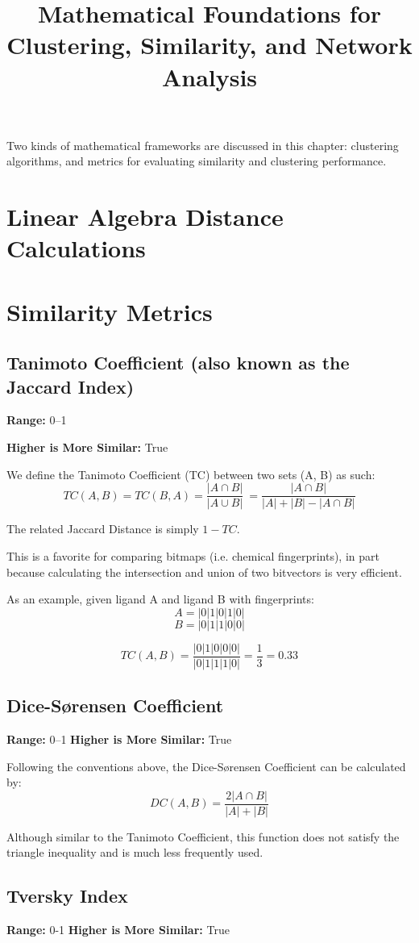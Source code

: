 \documentclass[12pt, english, course]{lecture}
\title{Mathematical Foundations for Clustering, Similarity, and Network Analysis}
\begin{document}
Two kinds of mathematical frameworks are discussed in this chapter: 
clustering algorithms, and metrics for evaluating similarity and clustering performance.

\section{Linear Algebra Distance Calculations}


\section{Similarity Metrics}

\subsection{Tanimoto Coefficient (also known as the Jaccard Index)}

\textbf{Range:} 0--1


\textbf{Higher is More Similar:} True

We define the Tanimoto Coefficient (TC) between two sets (A, B) as such:
\[TC(A,B) = TC(B,A) = \frac{|A\cap B|}{|A\cup B|}\ = \frac{|A\cap B|}{|A| + |B| - |A\cap B|}\]

The related Jaccard Distance is simply $1-TC$. 

This is a favorite for comparing bitmaps (i.e. chemical fingerprints), in part because calculating
the intersection and union of two bitvectors is very efficient.

As an example, given ligand A and ligand B with fingerprints:
\[A = |0|1|0|1|0|\]
\[B = |0|1|1|0|0|\]

\[TC(A,B) = \frac{|0|1|0|0|0|}{|0|1|1|1|0|} = \frac{1}{3} = 0.33 \]

\subsection{Dice-Sørensen Coefficient}

\textbf{Range:} 0--1
\textbf{Higher is More Similar:} True

Following the conventions above, the Dice-Sørensen Coefficient can be calculated by:
\[DC(A,B) = \frac{2|A\cap B|}{|A| + |B|}\]

Although similar to the Tanimoto Coefficient, this function does not satisfy the triangle inequality and is much less frequently used.

\subsection{Tversky Index}
\textbf{Range:} 0-1
\textbf{Higher is More Similar:} True
\end{document}
